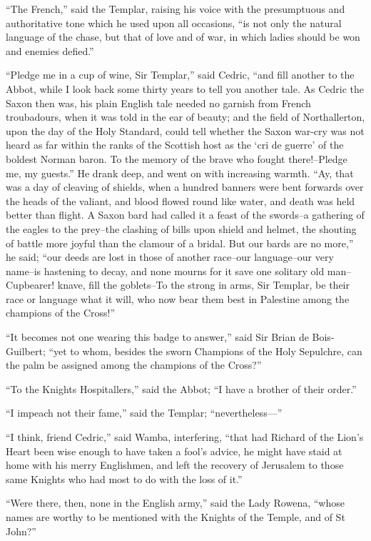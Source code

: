 ``The French,'' said the Templar, raising his voice with the
presumptuous and authoritative tone which he used upon all occasions,
``is not only the natural language of the chase, but that of love and of
war, in which ladies should be won and enemies defied.''

``Pledge me in a cup of wine, Sir Templar,'' said Cedric, ``and fill
another to the Abbot, while I look back some thirty years to tell you
another tale. As Cedric the Saxon then was, his plain English tale
needed no garnish from French troubadours, when it was told in the ear
of beauty; and the field of Northallerton, upon the day of the Holy
Standard, could tell whether the Saxon war-cry was not heard as far
within the ranks of the Scottish host as the `cri de guerre' of the
boldest Norman baron. To the memory of the brave who fought
there!--Pledge me, my guests.'' He drank deep, and went on with
increasing warmth. ``Ay, that was a day of cleaving of shields, when a
hundred banners were bent forwards over the heads of the valiant, and
blood flowed round like water, and death was held better than flight. A
Saxon bard had called it a feast of the swords--a gathering of the
eagles to the prey--the clashing of bills upon shield and helmet, the
shouting of battle more joyful than the clamour of a bridal. But our
bards are no more,'' he said; ``our deeds are lost in those of another
race--our language--our very name--is hastening to decay, and none
mourns for it save one solitary old man--Cupbearer! knave, fill the
goblets--To the strong in arms, Sir Templar, be their race or language
what it will, who now bear them best in Palestine among the champions of
the Cross!''

``It becomes not one wearing this badge to answer,'' said Sir Brian de
Bois-Guilbert; ``yet to whom, besides the sworn Champions of the Holy
Sepulchre, can the palm be assigned among the champions of the Cross?''

``To the Knights Hospitallers,'' said the Abbot; ``I have a brother of
their order.''

``I impeach not their fame,'' said the Templar; ``nevertheless---''

``I think, friend Cedric,'' said Wamba, interfering, ``that had Richard
of the Lion's Heart been wise enough to have taken a fool's advice, he
might have staid at home with his merry Englishmen, and left the
recovery of Jerusalem to those same Knights who had most to do with the
loss of it.''

``Were there, then, none in the English army,'' said the Lady Rowena,
``whose names are worthy to be mentioned with the Knights of the Temple,
and of St John?''

